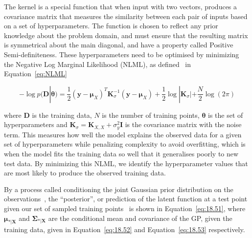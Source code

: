 \documentclass[12pt]{article}
\begin{document}
    The kernel is a special function that when input with two vectors, produces a covariance matrix that measures the similarity between each pair of inputs based on a set of hyperparameters.
    The function is chosen to reflect any prior knowledge about the problem domain, and must ensure that the resulting matrix is symmetrical about the main diagonal, and have a property called Positive Semi-definiteness.
    These hyperparameters need to be optimised by minimizing the Negative Log Marginal Likelihood (NLML), as defined~\cite{murphy2023probabilistic} in Equation~\ref{eq:NLML}

    \begin{equation}
        -\log p(\mathbf{D}|\boldsymbol{\theta}) = \frac{1}{2} (\mathbf{y} - \boldsymbol{\mu}_X)^T \mathbf{K}_{\sigma}^{-1} (\mathbf{y} - \boldsymbol{\mu}_X) + \frac{1}{2} \log |\mathbf{K}_{\sigma}| + \frac{N}{2} \log(2\pi)\label{eq:NLML}
    \end{equation}


    where $\mathbf{D}$ is the training data, $N$ is the number of training points, $\boldsymbol{\theta}$ is the set of hyperparameters and $\mathbf{K}_{\sigma} = \mathbf{K}_{X,X} + \sigma^2_y \mathbf{I}$ is the covariance matrix with the noise term.
    This measures how well the model explains the observed data for a given set of hyperparameters while penalizing complexity to avoid overfitting, which is when the model fits the training data so well that it generalises poorly to new test data.
    By minimizing this NLML, we identify the hyperparameter values that are most likely to produce the observed training data.


    By a process called conditioning the joint Gaussian prior distribution on the observations~\cite{rasmussen2006gaussian}, the ``posterior'', or prediction of the latent function at a test point given our set of sampled training points~\cite{murphy2023probabilistic} is shown in Equation~\ref{eq:18.51}, where $\boldsymbol{\mu}_{*\vert \mathbf{X}}$ and $\boldsymbol{\Sigma}_{*\vert \mathbf{X}}$ are the conditional mean and covariance of the GP, given the training data, given in Equation~\ref{eq:18.52} and Equation~\ref{eq:18.53} respectively.
\end{document}
